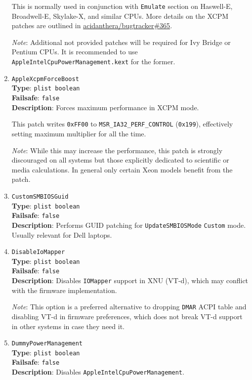 \documentclass[]{article}
\begin{document}
\begin{enumerate}
  This is normally used in conjunction with \texttt{Emulate} section on Haswell-E,
  Broadwell-E, Skylake-X, and similar CPUs. More details on the XCPM patches are outlined in
  \href{https://github.com/acidanthera/bugtracker/issues/365}{acidanthera/bugtracker\#365}.

  \emph{Note}: Additional not provided patches will be required for Ivy Bridge or Pentium
  CPUs. It is recommended to use \texttt{AppleIntelCpuPowerManagement.kext} for the former.

\item
  \texttt{AppleXcpmForceBoost}\\
  \textbf{Type}: \texttt{plist\ boolean}\\
  \textbf{Failsafe}: \texttt{false}\\
  \textbf{Description}: Forces maximum performance in XCPM mode.

  This patch writes \texttt{0xFF00} to \texttt{MSR\_IA32\_PERF\_CONTROL} (\texttt{0x199}),
  effectively setting maximum multiplier for all the time.

  \emph{Note}: While this may increase the performance, this patch is strongly discouraged
  on all systems but those explicitly dedicated to scientific or media calculations.
  In general only certain Xeon models benefit from the patch.

\item
  \texttt{CustomSMBIOSGuid}\\
  \textbf{Type}: \texttt{plist\ boolean}\\
  \textbf{Failsafe}: \texttt{false}\\
  \textbf{Description}: Performs GUID patching for \texttt{UpdateSMBIOSMode}
  \texttt{Custom} mode. Usually relevant for Dell laptops.

\item
  \texttt{DisableIoMapper}\\
  \textbf{Type}: \texttt{plist\ boolean}\\
  \textbf{Failsafe}: \texttt{false}\\
  \textbf{Description}: Disables \texttt{IOMapper} support in XNU (VT-d),
  which may conflict with the firmware implementation.

  \emph{Note}: This option is a preferred alternative to dropping \texttt{DMAR}
  ACPI table and disabling VT-d in firmware preferences, which does not break
  VT-d support in other systems in case they need it.

\item
  \texttt{DummyPowerManagement}\\
  \textbf{Type}: \texttt{plist\ boolean}\\
  \textbf{Failsafe}: \texttt{false}\\
  \textbf{Description}: Disables \texttt{AppleIntelCpuPowerManagement}.


\end{enumerate}
\end{document}
